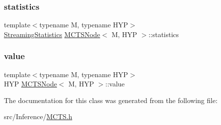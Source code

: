 \subsubsection{\texorpdfstring{statistics}{statistics}}
{\footnotesize\ttfamily template$<$typename M, typename H\+YP$>$ \\
\hyperlink{class_streaming_statistics}{Streaming\+Statistics} \hyperlink{class_m_c_t_s_node}{M\+C\+T\+S\+Node}$<$ M, H\+YP $>$\+::statistics}

\mbox{\label{class_m_c_t_s_node_a0442ab9a9378dabcd98ac7254b2e70a8}} 
\subsubsection{\texorpdfstring{value}{value}}
{\footnotesize\ttfamily template$<$typename M, typename H\+YP$>$ \\
H\+YP \hyperlink{class_m_c_t_s_node}{M\+C\+T\+S\+Node}$<$ M, H\+YP $>$\+::value}



The documentation for this class was generated from the following file\+:\begin{DoxyCompactItemize}
\item 
src/\+Inference/\hyperlink{_m_c_t_s_8h}{M\+C\+T\+S.\+h}\end{DoxyCompactItemize}
